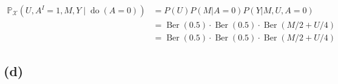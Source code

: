 \documentclass[10pt]{article}
\begin{document}
\begin{align*}
    \mathbb{P}_{\mathcal{X}}(U, A^I=1, M, Y \mid \operatorname{do}(A=0)) &=  P(U)P(M|A=0)P(Y|M, U, A=0)\\
    &= \operatorname{Ber}(0.5)\cdot\operatorname{Ber}(0.5)\cdot\operatorname{Ber}(M/2 + U/4)\\
    &= \operatorname{Ber}(0.5)\cdot\operatorname{Ber}(0.5)\cdot\operatorname{Ber}(M/2 + U/4)
    \end{align*}    
    

\subsection{(d)}
\end{document}
